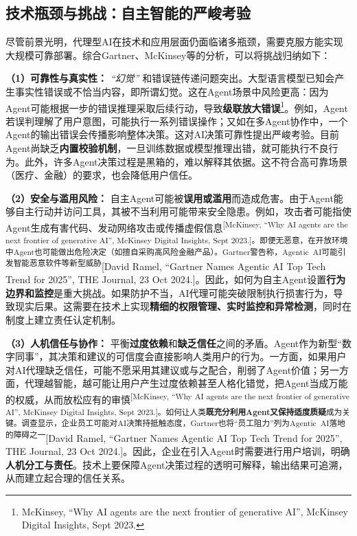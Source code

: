 \documentclass[
  letterpaper,
]{scrbook}
\begin{document}
\subsection{技术瓶颈与挑战：自主智能的严峻考验}\label{ux6280ux672fux74f6ux9888ux4e0eux6311ux6218ux81eaux4e3bux667aux80fdux7684ux4e25ux5cfbux8003ux9a8c}

尽管前景光明，代理型AI在技术和应用层面仍面临诸多瓶颈，需要克服方能实现大规模可靠部署。综合Gartner、McKinsey等的分析，可以将挑战归纳如下：

\textbf{（1）可靠性与真实性：} \emph{``幻觉''}
和错误链传递问题突出。大型语言模型已知会产生事实性错误或不恰当内容，即所谓幻觉。这在Agent场景中风险更高：因为Agent可能根据一步的错误推理采取后续行动，导致\textbf{级联放大错误}\footnote{McKinsey,
  ``Why AI agents are the next frontier of generative AI'', McKinsey
  Digital Insights, Sept 2023.}。例如，Agent若误判理解了用户意图，可能执行一系列错误操作；又如在多Agent协作中，一个Agent的输出错误会传播影响整体决策。这对AI决策可靠性提出严峻考验。目前Agent尚缺乏\textbf{内置校验机制}，一旦训练数据或模型推理出错，就可能执行不良行为。此外，许多Agent决策过程是黑箱的，难以解释其依据。这不符合高可靠场景（医疗、金融）的要求，也会降低用户信任。

\textbf{（2）安全与滥用风险：}
自主Agent可能被\textbf{误用或滥用}而造成危害。由于Agent能够自主行动并访问工具，其被不当利用可能带来安全隐患。例如，攻击者可能指使Agent生成有害代码、发动网络攻击或传播虚假信息\textsuperscript{{[}McKinsey,
``Why AI agents are the next frontier of generative AI'', McKinsey
Digital Insights, Sept
2023.{]}。即便无恶意，在开放环境中Agent也可能做出危险决定（如擅自采购高风险金融产品）。Gartner警告称，Agentic~AI可能引发智能恶意软件等新型威胁}{[}David
Ramel, ``Gartner Names Agentic AI Top Tech Trend for 2025'', THE
Journal, 23 Oct
2024.{]}。因此，如何为自主Agent设置\textbf{行为边界和监控}是重大挑战。如果防护不当，AI代理可能突破限制执行损害行为，导致现实后果。这需要在技术上实现\textbf{精细的权限管理、实时监控和异常检测}，同时在制度上建立责任认定机制。

\textbf{（3）人机信任与协作：}
平衡\textbf{过度依赖}和\textbf{缺乏信任}之间的矛盾。Agent作为新型``数字同事''，其决策和建议的可信度会直接影响人类用户的行为。一方面，如果用户对AI代理缺乏信任，可能不愿采用其建议或与之配合，削弱了Agent价值；另一方面，代理越智能，越可能让用户产生过度依赖甚至人格化错觉，把Agent当成万能的权威，从而放松应有的审慎\textsuperscript{{[}McKinsey,
``Why AI agents are the next frontier of generative AI'', McKinsey
Digital Insights, Sept
2023.{]}。如何让人类\textbf{既充分利用Agent又保持适度质疑}成为关键。调查显示，企业员工可能对AI决策持抵触态度，Gartner也将``员工阻力''列为Agentic~AI落地的障碍之一}{[}David
Ramel, ``Gartner Names Agentic AI Top Tech Trend for 2025'', THE
Journal, 23 Oct
2024.{]}。因此，企业在引入Agent时需要进行用户培训，明确\textbf{人机分工与责任}。技术上要保障Agent决策过程的透明可解释，输出结果可追溯，从而建立起合理的信任关系。
\end{document}
